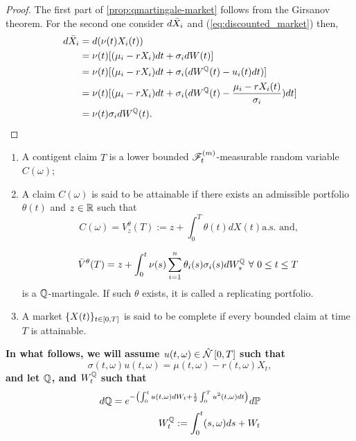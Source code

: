 \documentclass[../TGMAFFIRO.tex]{subfiles}
\begin{document}
\begin{proof}
	The first part of \ref{prop:qmartingale-market} follows from the Girsanov theorem. For the second one consider $d\bar{X}_i$ and (\ref{eq:discounted_market}) then,
	\begin{align*}
		d\bar{X}_i &= d(\nu(t)X_i(t)) \\
		&= \nu(t)[(\mu_i - r X_i)dt + \sigma_i dW(t)]\\
		&= \nu(t)[(\mu_i - r X_i)dt + \sigma_i (dW^{\mathbb{Q}}(t) - u_i(t)dt)]\\
		&= \nu(t)[(\mu_i - r X_i)dt + \sigma_i (dW^{\mathbb{Q}}(t) - \frac{\mu_i - r X_i(t)}{\sigma_i})dt]\\
		&= \nu(t)\sigma_idW^{\mathbb{Q}}(t).
	\end{align*}
\end{proof}

\begin{definition}
\begin{enumerate}
	\item A contigent claim $T$ is a lower bounded $\mathscr{F}_t^{(m)}$-measurable random variable $C(\omega)$;
	\item A claim $C(\omega)$ is said to be attainable if there exists an admissible portfolio $\theta(t)$ and $z\in\mathbb{R}$ such that
	\[
		C(\omega) = V_z^{\theta}(T) := z + \int_0^T \theta(t)dX(t) \text{a.s. and,}
	\]
	
	\begin{equation}
		\bar{V}^\theta(T)	 = z + \int_0^t \nu(s)\sum_{i=1}^{n}\theta_i(s)\sigma_i(s) dW^{\mathbb{Q}}_s \ \forall \ 0 \leq t \leq T
	\end{equation} 
	is a $\mathbb{Q}$-martingale. If such $\theta$ exists, it is called a replicating portfolio.
	\item A market $\{X(t)\}_{t\in[0,T]}$ is said to be complete if every bounded claim at time $T$ is attainable.
\end{enumerate}
\end{definition}

\textbf{
In what follows, we will assume $u(t,\omega) \in \hat{\mathcal{N}}\left[0, T\right]$ such that
\begin{equation}\label{eq:condition_change_measure}
	\sigma(t,\omega) u(t,\omega) = \mu(t,\omega) - r(t,\omega) X_t,
\end{equation}
and let $\mathbb{Q}$, and $W_t^{\mathbb{Q}}$ such that
\begin{align}
  d\mathbb{Q} = e^{-\left(\int_0^t u(t,\omega) dW_t + \frac{1}{2}\int_0^T u^2(t,\omega) dt\right)} d\mathbb{P} \label{eq:emmq} \\
  W^{\mathbb{Q}}_t := \int_0^t (s,\omega) ds + W_t
\end{align}
}
\end{document}
